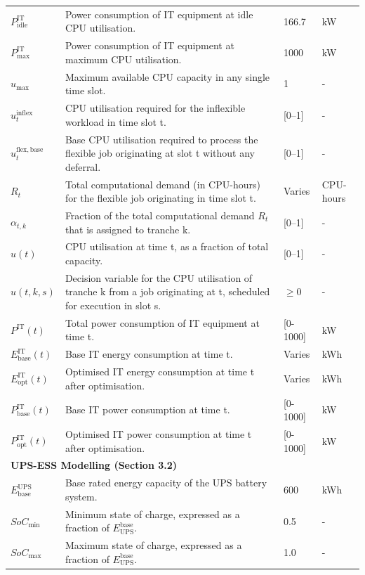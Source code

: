 \documentclass[lettersize,journal]{IEEEtran}
\begin{document}
{{\begin{longtable}{p{} p{} p{} p{}}
$P^{\mathrm{IT}}_{\mathrm{idle}}$ & Power consumption of IT equipment at idle CPU utilisation. & 166.7 &kW \\
$P^{\mathrm{IT}}_{\mathrm{max}}$ & Power consumption of IT equipment at maximum CPU utilisation. & 1000 &kW \\
$u_{\max}$ & Maximum available CPU capacity in any single time slot. & 1 & - \\
$u_t^{\mathrm{inflex}}$ & CPU utilisation required for the inflexible workload in time slot t. & [0--1] & - \\
$u_t^{\mathrm{flex,base}}$ & Base CPU utilisation required to process the flexible job originating at slot t without any deferral. & [0--1] & - \\
$R_t$ & Total computational demand (in CPU-hours) for the flexible job originating in time slot t. & Varies & CPU-hours \\
$\alpha_{t,k}$ & Fraction of the total computational demand $R_t$ that is assigned to tranche k. & [0--1] & - \\
$u(t)$ & CPU utilisation at time t, as a fraction of total capacity. & [0--1] & - \\
$u(t,k,s)$ & Decision variable for the CPU utilisation of tranche k from a job originating at t, scheduled for execution in slot s. & $\geq 0$ & - \\
$P^{\mathrm{IT}}(t)$ & Total power consumption of IT equipment at time t. & [0-1000] &kW \\
$E^{\mathrm{IT}}_{\mathrm{base}}(t)$ & Base IT energy consumption at time t. & Varies &kWh \\
$E^{\mathrm{IT}}_{\mathrm{opt}}(t)$ & Optimised IT energy consumption at time t after optimisation. & Varies &kWh \\
$P^{\mathrm{IT}}_{\mathrm{base}}(t)$ & Base IT power consumption at time t. & [0-1000] &kW \\
$P^{\mathrm{IT}}_{\mathrm{opt}}(t)$ & Optimised IT power consumption at time t after optimisation. & [0-1000] &kW \\
\midrule
\multicolumn{4}{l}{\textbf{UPS-ESS Modelling (Section 3.2)}} \\
\midrule
$E^{\mathrm{UPS}}_{\mathrm{base}}$ & Base rated energy capacity of the UPS battery system. & 600 &kWh \\
$SoC_{\min}$ & Minimum state of charge, expressed as a fraction of $E_{\mathrm{UPS}}^{\mathrm{base}}$. & 0.5 & - \\
$SoC_{\max}$ & Maximum state of charge, expressed as a fraction of $E_{\mathrm{UPS}}^{\mathrm{base}}$. & 1.0 & - \\

\end{longtable}}}
\end{document}
